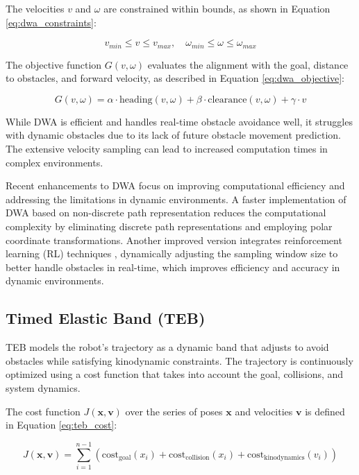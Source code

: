 \documentclass[conference]{IEEEtran}
\begin{document}
The velocities \(v\) and \(\omega\) are constrained within bounds, as shown in Equation \eqref{eq:dwa_constraints}:

\begin{equation}
\label{eq:dwa_constraints}
v_{min} \leq v \leq v_{max}, \quad \omega_{min} \leq \omega \leq \omega_{max}
\end{equation}

The objective function \(G(v, \omega)\) evaluates the alignment with the goal, distance to obstacles, and forward velocity, as described in Equation \eqref{eq:dwa_objective}:

\begin{equation}
\label{eq:dwa_objective}
G(v, \omega) = \alpha \cdot \text{heading}(v, \omega) + \beta \cdot \text{clearance}(v, \omega) + \gamma \cdot v
\end{equation}

While DWA is efficient and handles real-time obstacle avoidance well, it struggles with dynamic obstacles due to its lack of future obstacle movement prediction. The extensive velocity sampling can lead to increased computation times in complex environments.

Recent enhancements to DWA focus on improving computational efficiency and addressing the limitations in dynamic environments. A faster implementation of DWA based on non-discrete path representation \cite{lin2023faster} reduces the computational complexity by eliminating discrete path representations and employing polar coordinate transformations. Another improved version integrates reinforcement learning (RL) techniques \cite{zhou2022improved}, dynamically adjusting the sampling window size to better handle obstacles in real-time, which improves efficiency and accuracy in dynamic environments.

\subsection{Timed Elastic Band (TEB)}
TEB models the robot’s trajectory as a dynamic band that adjusts to avoid obstacles while satisfying kinodynamic constraints. The trajectory is continuously optimized using a cost function that takes into account the goal, collisions, and system dynamics.

The cost function \(J(\mathbf{x}, \mathbf{v})\) over the series of poses \(\mathbf{x}\) and velocities \(\mathbf{v}\) is defined in Equation \eqref{eq:teb_cost}:

\begin{equation}
\label{eq:teb_cost}
J(\mathbf{x}, \mathbf{v}) = \sum_{i=1}^{n-1} \left( \text{cost}_{\text{goal}}(x_i) + \text{cost}_{\text{collision}}(x_i) + \text{cost}_{\text{kinodynamics}}(v_i) \right)
\end{equation}
\end{document}
